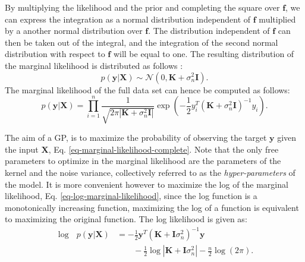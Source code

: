 \documentclass[useAMS,usenatbib,fleqn]{mn2e}
\begin{document}
By multiplying the likelihood and the prior and completing the square over $\mathbf{f}$, we can express the integration as a normal distribution independent of $\mathbf{f}$ multiplied by a another normal distribution over $\mathbf{f}$. The distribution independent of $\mathbf{f}$ can then be taken out of the integral, and the integration of the second normal distribution with respect to $\mathbf{f}$ will be equal to one. The resulting distribution of the marginal likelihood is distributed as follows \citep{rasmussen2006gaussian}:
\begin{equation}
p\left(\mathbf{y}|\mathbf{X}\right) \sim\mathcal{N} \left(0,\mathbf{K}+\sigma_{n}^{2}\mathbf{I}\right).
\label{eq-marginal-likelihood}
\end{equation}
The marginal likelihood of the full data set can hence be computed as follows:
\begin{equation}
p\left(\mathbf{y}|\mathbf{X}\right) = \prod_{i=1}^{n}\frac{1}{\sqrt{2\pi\left |\mathbf{K}+\sigma_{n}^{2}\mathbf{I}\right |}}\exp\left({-\frac{1}{2}y_{i}^{T}\left(\mathbf{K}+\sigma_{n}^{2}\mathbf{I}\right)^{-1}y_{i}}\right).
\label{eq-marginal-likelihood-complete}
\end{equation}

The aim of a GP, is to maximize the probability of observing the target $\mathbf{y}$ given the input $\mathbf{X}$, Eq. \eqref{eq-marginal-likelihood-complete}. Note that the only free parameters to optimize in the marginal likelihood are the parameters of the kernel and the noise variance, collectively referred to as the \emph{hyper-parameters} of the model. It is more convenient however to maximize the log of the marginal likelihood, Eq. \eqref{eq-log-marginal-likelihood}, since the log function is a monotonically increasing function, maximizing the log of a function is equivalent to maximizing the original function. The log likelihood is given as:
\begin{align}
\label{eq-log-marginal-likelihood}
\log\text{ }p(\mathbf{y}|\mathbf{X}) &= -\frac{1}{2}\mathbf{y}^{T}\left(\mathbf{K}+\mathbf{I}\sigma_{n}^{2} \right)^{-1}\mathbf{y} \nonumber \\
&\qquad -\frac{1}{2} \log\left | \mathbf{K}+\mathbf{I}\sigma_{n}^{2}\right|-\frac{n}{2}\log(2\pi).
\end{align}
\end{document}
